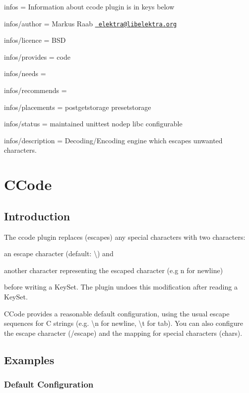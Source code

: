
\begin{DoxyItemize}
\item infos = Information about ccode plugin is in keys below
\item infos/author = Markus Raab \href{mailto:elektra@libelektra.org}{\texttt{ elektra@libelektra.\+org}}
\item infos/licence = B\+SD
\item infos/provides = code
\item infos/needs =
\item infos/recommends =
\item infos/placements = postgetstorage presetstorage
\item infos/status = maintained unittest nodep libc configurable
\item infos/description = Decoding/\+Encoding engine which escapes unwanted characters.
\end{DoxyItemize}\hypertarget{autotoc_md78_src_plugins_ccode_README_md}{}\section{C\+Code}\label{autotoc_md78_src_plugins_ccode_README_md}
\hypertarget{autotoc_md78_autotoc_md79}{}\subsection{Introduction}\label{autotoc_md78_autotoc_md79}
The {\ttfamily ccode} plugin replaces (escapes) any special characters with two characters\+:


\begin{DoxyItemize}
\item an escape character (default\+: {\ttfamily \textbackslash{}}) and
\item another character representing the escaped character (e.\+g {\ttfamily n} for newline)
\end{DoxyItemize}

before writing a {\ttfamily Key\+Set}. The plugin undoes this modification after reading a {\ttfamily Key\+Set}.

C\+Code provides a reasonable default configuration, using the usual escape sequences for C strings (e.\+g. {\ttfamily \textbackslash{}n} for newline, {\ttfamily \textbackslash{}t} for tab). You can also configure the escape character ({\ttfamily /escape}) and the mapping for special characters ({\ttfamily chars}).\hypertarget{autotoc_md78_autotoc_md80}{}\subsection{Examples}\label{autotoc_md78_autotoc_md80}
\hypertarget{autotoc_md78_autotoc_md81}{}\subsubsection{Default Configuration}\label{autotoc_md78_autotoc_md81}


